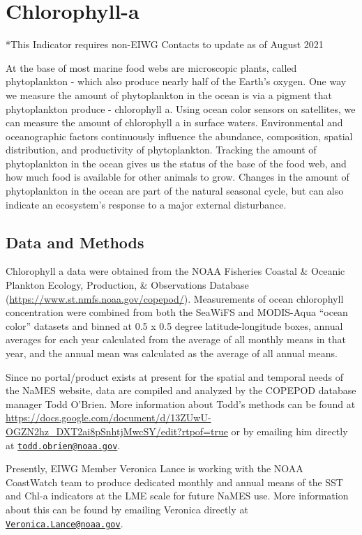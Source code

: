 \documentclass[
]{book}
\begin{document}
\hypertarget{chlorophyll-a}{%
\chapter{Chlorophyll-a}\label{chlorophyll-a}}

*This Indicator requires non-EIWG Contacts to update as of August 2021

At the base of most marine food webs are microscopic plants, called phytoplankton - which also produce nearly half of the Earth's oxygen. One way we measure the amount of phytoplankton in the ocean is via a pigment that phytoplankton produce - chlorophyll a. Using ocean color sensors on satellites, we can measure the amount of chlorophyll a in surface waters. Environmental and oceanographic factors continuously influence the abundance, composition, spatial distribution, and productivity of phytoplankton. Tracking the amount of phytoplankton in the ocean gives us the status of the base of the food web, and how much food is available for other animals to grow. Changes in the amount of phytoplankton in the ocean are part of the natural seasonal cycle, but can also indicate an ecosystem's response to a major external disturbance.

\hypertarget{data-and-methods}{%
\section{Data and Methods}\label{data-and-methods}}

Chlorophyll a data were obtained from the NOAA Fisheries Coastal \& Oceanic Plankton Ecology, Production, \& Observations Database (\url{https://www.st.nmfs.noaa.gov/copepod/}). Measurements of ocean chlorophyll concentration were combined from both the SeaWiFS and MODIS-Aqua ``ocean color'' datasets and binned at 0.5 x 0.5 degree latitude-longitude boxes, annual averages for each year calculated from the average of all monthly means in that year, and the annual mean was calculated as the average of all annual means.

Since no portal/product exists at present for the spatial and temporal needs of the NaMES website, data are compiled and analyzed by the COPEPOD database manager Todd O'Brien. More information about Todd's methods can be found at \url{https://docs.google.com/document/d/13ZUwU-OGZN2hz_DXT2ai8pSnhtjMwcSY/edit?rtpof=true} or by emailing him directly at \href{mailto:todd.obrien@noaa.gov}{\nolinkurl{todd.obrien@noaa.gov}}.

Presently, EIWG Member Veronica Lance is working with the NOAA CoastWatch team to produce dedicated monthly and annual means of the SST and Chl-a indicators at the LME scale for future NaMES use. More information about this can be found by emailing Veronica directly at \href{mailto:Veronica.Lance@noaa.gov}{\nolinkurl{Veronica.Lance@noaa.gov}}.
\end{document}
